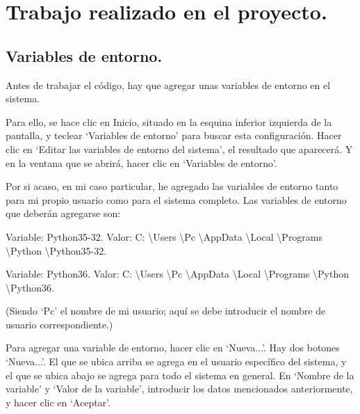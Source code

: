 \section{Trabajo realizado en el proyecto.}

\subsection{Variables de entorno.}

Antes de trabajar el código, hay que agregar unas variables de entorno en el sistema.

Para ello, se hace clic en Inicio, situado en la esquina inferior izquierda de la pantalla, y teclear ‘Variables de entorno’ para buscar esta configuración. Hacer clic en ‘Editar las variables de entorno del sistema’, el resultado que aparecerá. Y en la ventana que se abrirá, hacer clic en ‘Variables de entorno’.

Por si acaso, en mi caso particular, he agregado las variables de entorno tanto para mi propio usuario como para el sistema completo. Las variables de entorno que deberán agregarse son:

Variable: Python35-32. Valor: C: \textbackslash Users \textbackslash Pc \textbackslash AppData \textbackslash Local \textbackslash Programs \textbackslash Python \textbackslash Python35-32.

Variable: Python36. Valor: C: \textbackslash Users \textbackslash Pc \textbackslash AppData \textbackslash Local \textbackslash Programs \textbackslash Python \textbackslash Python36.

(Siendo ‘Pc’ el nombre de mi usuario; aquí se debe introducir el nombre de usuario correspondiente.)

Para agregar una variable de entorno, hacer clic en ‘Nueva...’. Hay dos botones ‘Nueva...’. El que se ubica arriba se agrega en el usuario específico del sistema, y el que se ubica abajo se agrega para todo el sistema en general. En ‘Nombre de la variable’ y ‘Valor de la variable’, introducir los datos mencionados anteriormente, y hacer clic en ‘Aceptar’.

